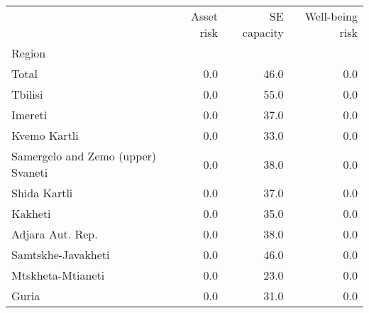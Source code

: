\begin{tabular}{lrrr}
\toprule
{} &  Asset risk &  SE capacity &  Well-being risk \\
Region                             &             &              &                  \\
\midrule
Total                              &         0.0 &         46.0 &              0.0 \\
Tbilisi                            &         0.0 &         55.0 &              0.0 \\
Imereti                            &         0.0 &         37.0 &              0.0 \\
Kvemo Kartli                       &         0.0 &         33.0 &              0.0 \\
Samergelo and Zemo (upper) Svaneti &         0.0 &         38.0 &              0.0 \\
Shida Kartli                       &         0.0 &         37.0 &              0.0 \\
Kakheti                            &         0.0 &         35.0 &              0.0 \\
Adjara Aut. Rep.                   &         0.0 &         38.0 &              0.0 \\
Samtskhe-Javakheti                 &         0.0 &         46.0 &              0.0 \\
Mtskheta-Mtianeti                  &         0.0 &         23.0 &              0.0 \\
Guria                              &         0.0 &         31.0 &              0.0 \\
\bottomrule
\end{tabular}
